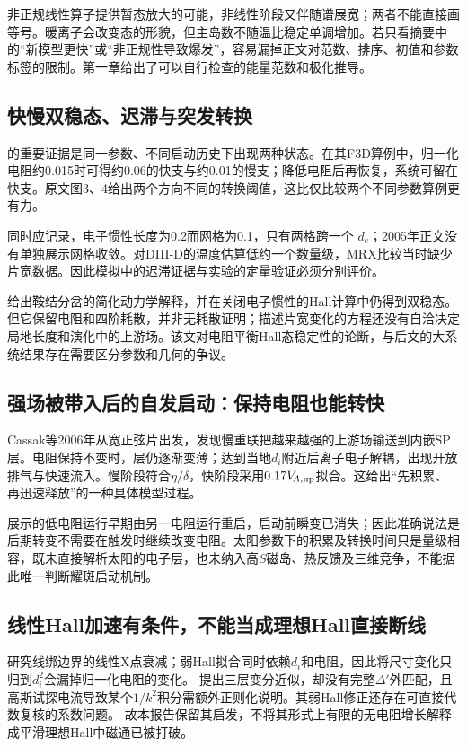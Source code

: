 非正规线性算子提供暂态放大的可能，非线性阶段又伴随谱展宽；两者不能直接画等号。暖离子会改变态的形貌，但主岛数不随温比稳定单调增加。若只看摘要中的“新模型更快”或“非正规性导致爆发”，容易漏掉正文对范数、排序、初值和参数标签的限制。第一章给出了可以自行检查的能量范数和极化推导。

\subsection{快慢双稳态、迟滞与突发转换}
\citet{Cassak2005}的重要证据是同一参数、不同启动历史下出现两种状态。在其F3D算例中，归一化电阻约0.015时可得约0.06的快支与约0.01的慢支；降低电阻后再恢复，系统可留在快支。原文图3、4给出两个方向不同的转换阈值，这比仅比较两个不同参数算例更有力。

同时应记录，电子惯性长度为0.2而网格为0.1，只有两格跨一个 $d_e$；2005年正文没有单独展示网格收敛。对DIII-D的温度估算低约一个数量级，MRX比较当时缺少片宽数据。因此模拟中的迟滞证据与实验的定量验证必须分别评价。

\citet{Cassak2010}给出鞍结分岔的简化动力学解释，并在关闭电子惯性的Hall计算中仍得到双稳态。但它保留电阻和四阶耗散，并非无耗散证明；描述片宽变化的方程还没有自洽决定局地长度和演化中的上游场。该文对电阻平衡Hall态稳定性的论断，与后文的大系统结果存在需要区分参数和几何的争议。

\subsection{强场被带入后的自发启动：保持电阻也能转快}
Cassak等2006年从宽正弦片出发，发现慢重联把越来越强的上游场输送到内嵌SP层。电阻保持不变时，层仍逐渐变薄；达到当地$d_i$附近后离子电子解耦，出现开放排气与快速流入。慢阶段符合$\eta/\delta$，快阶段采用$0.17V_{\!A,\rm up}$拟合。这给出“先积累、再迅速释放”的一种具体模型过程。\citep{Cassak2006}

展示的低电阻运行早期由另一电阻运行重启，启动前瞬变已消失；因此准确说法是后期转变不需要在触发时继续改变电阻。太阳参数下的积累及转换时间只是量级相容，既未直接解析太阳的电子层，也未纳入高$S$磁岛、热反馈及三维竞争，不能据此唯一判断耀斑启动机制。

\subsection{线性Hall加速有条件，不能当成理想Hall直接断线}
\citet{L123}研究线绑边界的线性X点衰减；弱Hall拟合同时依赖$d_i$和电阻，因此将尺寸变化只归到$d_i^2$会漏掉归一化电阻的变化。
\citet{L122}提出三层变分近似，却没有完整$\Delta'$外匹配，且高斯试探电流导致某个$1/k^2$积分需额外正则化说明。其弱Hall修正还存在可直接代数复核的系数问题。
故本报告保留其启发，不将其形式上有限的无电阻增长解释成平滑理想Hall中磁通已被打破。

